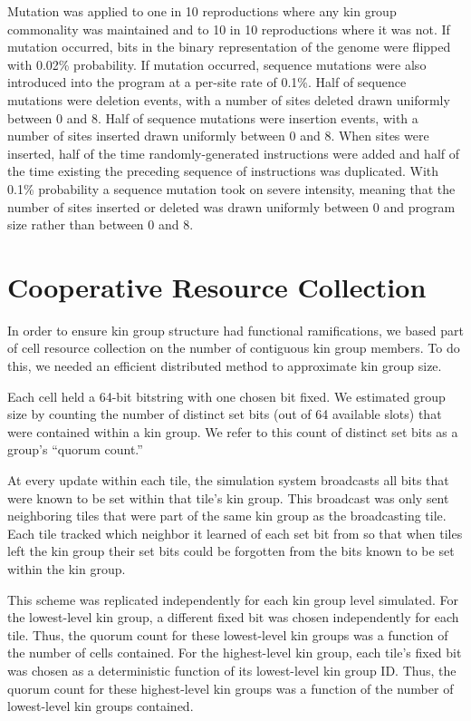 Mutation was applied to one in 10 reproductions where any kin group commonality was maintained and to 10 in 10 reproductions where it was not. 
If mutation occurred, bits in the binary representation of the genome were flipped with 0.02\% probability.
If mutation occurred, sequence mutations were also introduced into the program at a per-site rate of 0.1\%.
Half of sequence mutations were deletion events, with a number of sites deleted drawn uniformly between 0 and 8.
Half of sequence mutations were insertion events, with a number of sites inserted drawn uniformly between 0 and 8.
When sites were inserted, half of the time randomly-generated instructions were added and half of the time existing the preceding sequence of instructions was duplicated.
With 0.1\% probability a sequence mutation took on severe intensity, meaning that the number of sites inserted or deleted was drawn uniformly between 0 and program size rather than between 0 and 8. 

\section{Cooperative Resource Collection} 

In order to ensure kin group structure had functional ramifications, we based part of cell resource collection on the number of contiguous kin group members.
To do this, we needed an efficient distributed method to approximate kin group size.

Each cell held a 64-bit bitstring with one chosen bit fixed.
We estimated group size by counting the number of distinct set bits (out of 64 available slots) that were contained within a kin group.
We refer to this count of distinct set bits as a group's ``quorum count.''

At every update within each tile, the simulation system broadcasts all bits that were known to be set within that tile's kin group.
This broadcast was only sent neighboring tiles that were part of the same kin group as the broadcasting tile.
Each tile tracked which neighbor it learned of each set bit from so that when tiles left the kin group their set bits could be forgotten from the bits known to be set within the kin group.

This scheme was replicated independently for each kin group level simulated.
For the lowest-level kin group, a different fixed bit was chosen independently for each tile.
Thus, the quorum count for these lowest-level kin groups was a function of the number of cells contained.
For the highest-level kin group, each tile's fixed bit was chosen as a deterministic function of its lowest-level kin group ID.
Thus, the quorum count for these highest-level kin groups was a function of the number of lowest-level kin groups contained.

